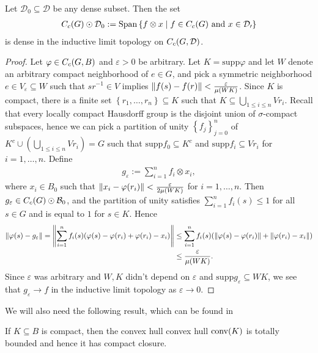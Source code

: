 \begin{lemma}
Let $\mathcal{D}_0 \subseteq \mathcal{D}$ be any dense subset. Then the set
\begin{align*}
	C_c(G) \odot \mathcal{D}_0 := \mathrm{Span}\left\{ f \otimes x \mid f \in C_c(G) \text{ and } x \in \mathcal{D_0} \right\} 
\end{align*}
is dense in the inductive limit topology on $C_c(G,\mathcal{D})$.
	\label{cross:indlmdense}
\end{lemma}
\begin{proof}	
	Let $\varphi \in C_c(G,B)$ and $\varepsilon > 0$ be arbitrary. Let $K= \mathrm{supp} \varphi$ and let $W$ denote an arbitrary compact neighborhood of $e \in G$, and pick  a symmetric neighborhood $e \in V_{\varepsilon} \subseteq W$ such that $sr^{-1} \in V$ implies $\left\lVert f(s) - f(r) \right\rVert < \frac{\varepsilon}{\mu(WK)}$. Since $K$ is compact, there is a finite set $\left\{ r_1,\dots,r_n \right\} \subseteq K$ such that $K \subseteq \bigcup_{1 \leq i \leq n} V r_i$. Recall that every locally compact Hausdorff group is the disjoint union of $\sigma$-compact subspaces, hence we can pick a partition of unity $\left\{ f_j \right\}_{j=0}^n$ of $K^c \cup \left( \bigcup_{1 \leq i \leq n} Vr_i\right)=G$ such that $\mathrm{supp}f_0 \subseteq K^c$ and $\mathrm{supp}f_i \subseteq V r_i$ for $i = 1 ,\dots,n$. Define
	\begin{align*}
		g_\varepsilon := \sum_{i=1}^n f_i \otimes x_i,
	\end{align*}
	where $x_i \in B_0$ such that $\left\lVert x_i - \varphi(r_i)\right\rVert < \frac{\varepsilon}{2\mu(WK)}$ for $i = 1,\dots,n$. Then $g_\varepsilon \in C_c(G) \odot \mathcal{B}_0$, and the partition of unity satisfies $\sum_{i=1}^n f_i(s) \leq 1$ for all $s \in G$ and is equal to $1$ for $s \in K$. Hence
	\begin{align*}
		\left\lVert\varphi(s) - g_{\varepsilon}\right\rVert = \left\lVert \sum_{i=1}^n f_i(s)(\varphi(s) - \varphi(r_i)+\varphi(r_i)-x_i)\right\rVert &\leq \sum_{i=1}^n f_i(s) (\left\lVert \varphi(s) - \varphi(r_i)\right\rVert+\left\lVert \varphi(r_i)-x_i\right\rVert) \\
		&\leq \frac{\varepsilon}{\mu(WK)}.
	\end{align*}
	Since $\varepsilon$ was arbitrary and $W,K$ didn't depend on $\varepsilon$ and $ \mathrm{supp} g_\varepsilon \subseteq WK$, we see that $g_\varepsilon \to f$ in the inductive limit topology as $\varepsilon \to 0$.
\end{proof}
We will also need the following result, which can be found in \cite[Theorem 3.20, part (b, c)]{rudin1991functional}
\begin{lemma}
	If $K \subseteq B$ is compact, then the convex hull convex hull $\operatorname{conv}(K)$ is totally bounded and hence it has compact closure.
	\label{cross:clconvcomp}
\end{lemma}


